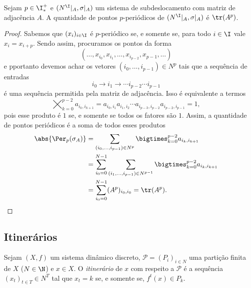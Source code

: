 \begin{proposition}
Sejam $p \in \I^+_*$ e $(N^\I|_A,\sigma|_A)$ um sistema de subdeslocamento com matriz de adjacência $A$. A quantidade de pontos $p$-periódicos de $(N^\I|_A,\sigma|_A)$ é $\tr(A^p)$.
\end{proposition}
\begin{proof}
Sabemos que $(x_i)_{i \in \I}$ é $p$-periódico se, e somente se, para todo $i \in \I$ vale $x_i = x_{i+p}$. Sendo assim, procuramos os pontos da forma
	\begin{equation*}
	(\ldots,x_{i_0},x_{i_1},\ldots,x_{i_{p-2}},x_{p-1},\ldots)
	\end{equation*}
e pportanto devemos achar os vetores $(i_0,\ldots,i_{p-1}) \in N^p$ tais que a sequência de entradas
	\begin{equation*}
	i_0 \rightarrow i_1 \rightarrow \cdots i_{p-2} \cdots i_{p-1}
	\end{equation*}
é uma sequência permitida pela matriz de adjacência. Isso é equivalente a termos
	\begin{equation*}
	\bigtimes_{k=0}^{p-2} a_{i_k,i_{k+1}} = a_{i_0,i_1}a_{i_1,i_2}\cdots a_{i_{p-3},i_{p-2}}a_{i_{p-2},i_{p-1}} = 1,
	\end{equation*}
pois esse produto é $1$ se, e somente se todos os fatores são $1$. Assim, a quantidade de pontos periódicos é a soma de todos esses produtos
	\begin{align*}
	\abs{\Per_p(\sigma_A)} &= \sum_{(i_0,\ldots,i_{p-1}) \in N^p} \bigtimes_{k=0}^{p-2} a_{i_k,i_{k+1}} \\
		&= \sum_{i_0=0}^{N-1} \sum_{(i_1,\ldots,i_{p-1}) \in N^{p-1}} \bigtimes_{k=0}^{p-2} a_{i_k,i_{k+1}} \\
		&= \sum_{i_0=0}^{N-1} (A^p)_{i_0,i_0} = \tr(A^p).
	\end{align*}
\end{proof}

\subsection{Itinerários}

\begin{definition}
Sejam $(X,f)$ um sistema dinâmico discreto, $\mathcal P=(P_i)_{i \in N}$ uma partição finita de $X$ ($N \in \N$) e $x \in X$. O \emph{itinerário} de $x$ com respeito a $\mathcal P$ é a sequência
$(x_t)_{t \in T} \in N^T$ tal que $x_t=k$ se, e somente se, $f^t(x) \in P_k$.
\end{definition}

